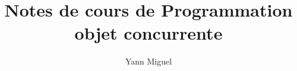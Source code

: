 \documentclass[12pt, a4paper]{article}
\title{Notes de cours de Programmation objet concurrente}
\author{Yann Miguel}
\begin{document}
\ttfamily
\maketitle
\tableofcontents
\newpage






\end{document}
